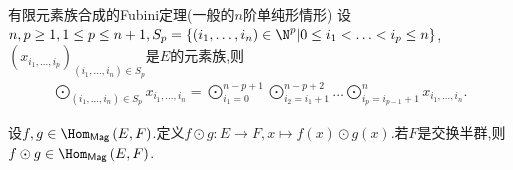 \begin{corollary}{有限元素族合成的Fubini定理(一般的$n$阶单纯形情形)}{}
	设$n,p\geq 1,1\leq p\leq n+1,S_{p}=\left\{\left(i_{1},\ldots,i_{n}\right)\in\N^{p}\middle|0\leq i_{1}<\ldots<i_{p}\leq n\right\}$,$\left(x_{i_{1},\ldots,i_{p}}\right)_{\left(i_{1},\ldots,i_{n}\right)\in S_{p}}$是$E$的元素族,则
	\begin{align*}
		\bigodot\limits_{\left(i_{1},\ldots,i_{n}\right)\in S_{p}}x_{i_{1},\ldots,i_{n}}=\bigodot\limits_{i_{1}=0}^{n-p+1}\bigodot\limits_{i_{2}=i_{1}+1}^{n-p+2}\ldots\bigodot\limits_{i_{p}=i_{p-1}+1}^{n}x_{i_{1},\ldots,i_{n}}.
	\end{align*}
\end{corollary}

\begin{proposition}{}{}	
	设$f,g\in\Hom_{\mathsf{Mag}}\left(E,F\right)$.定义$f\odot g:E\to F,x\mapsto f\left(x\right)\odot g\left(x\right)$.若$F$是交换半群,则$f\odot g\in\Hom_{\mathsf{Mag}}\left(E,F\right)$.
\end{proposition}





